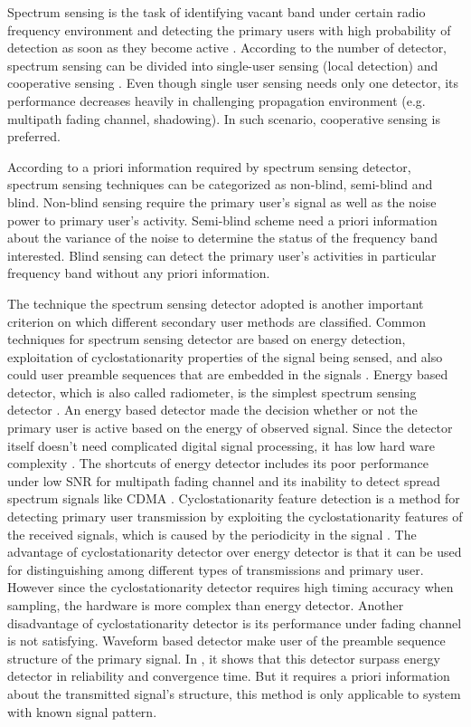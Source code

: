 \documentclass{report}
\begin{document}
\begin{spacing}{2.0}
Spectrum sensing is the task of identifying vacant band under certain radio frequency environment and detecting the primary users with high probability of detection as soon as they become active \cite{umar2012spectrum}. According to the number of detector, spectrum sensing can be divided into single-user sensing (local detection) \cite{axell2010overview} \cite{wang2011advances} and cooperative sensing \cite{akyildiz2011cooperative}. Even though single user sensing needs only one detector, its performance decreases heavily in challenging propagation environment (e.g. multipath fading channel, shadowing). In such scenario, cooperative sensing is preferred.  

According to a priori information required by spectrum sensing detector, spectrum sensing techniques can be categorized as non-blind, semi-blind and blind. Non-blind sensing require the primary user's signal as well as the noise power to primary user's activity. Semi-blind scheme need a priori information about the variance of the noise to determine the status of the frequency band interested. Blind sensing can detect the primary user's activities in particular frequency band without any priori information. 

The technique the spectrum sensing detector adopted is another important criterion on which different secondary user methods are classified.  
Common techniques for spectrum sensing detector are based on energy detection, exploitation of cyclostationarity properties of the signal being sensed, and also could user preamble sequences that are embedded in the signals \cite{cabric2004implementation}. 
Energy based detector, which is also called radiometer, is the simplest spectrum sensing detector \cite{poor1994introduction}. An energy based detector made the decision whether or not the primary user is active based on the energy of observed signal. 
Since the detector itself doesn't need complicated digital signal processing, it has low hard ware complexity \cite{ma2009signal}. The shortcuts of energy detector includes its poor performance under low SNR for multipath fading channel and its inability to detect spread spectrum signals like CDMA \cite{urkowitz1967energy}. 
Cyclostationarity feature detection is a method for detecting primary user transmission by exploiting the cyclostationarity features of the received signals, which is caused by the periodicity in the signal \cite{goldsmith2009breaking}. The advantage of cyclostationarity detector over energy detector is that it can be used for distinguishing among different types of transmissions and primary user. However since the cyclostationarity detector requires high timing accuracy when sampling, the hardware is more complex than energy detector. Another disadvantage of cyclostationarity detector is its performance under fading channel is not satisfying.   
Waveform based detector make user of the preamble sequence structure of the primary signal. In \cite{tang2005some}, it shows that this detector surpass energy detector in reliability and convergence time. But it requires a priori information about the transmitted signal's structure, this method is only applicable to system with known signal pattern.  


\end{spacing}
\end{document}
